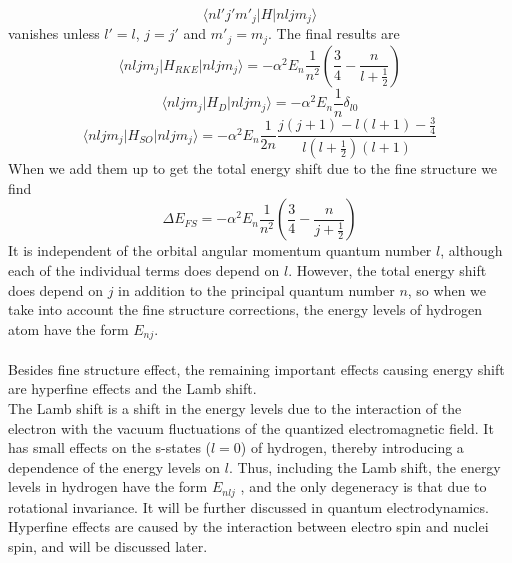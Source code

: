 \[\langle n l' j' m'_j | H | n l j m_j\rangle\]
vanishes unless $l'=l$, $j=j'$ and $m'_j = m_j$. The final results are
\[\langle n l j m_j | H_{RKE} | n l j m_j\rangle = -\alpha^2 E_n \frac{1}{n^2} \left(\frac{3}{4} - \frac{n}{l+\frac{1}{2}} \right)\]
\[\langle n l j m_j | H_{D} | n l j m_j\rangle = -\alpha^2 E_n \frac{1}{n}\delta_{l0}\]
\[\langle n l j m_j | H_{SO} | n l j m_j\rangle = -\alpha^2 E_n \frac{1}{2n} \frac{j(j+1)-l(l+1)-\frac{3}{4}}{l(l+\frac{1}{2})(l+1)}\]
When we add them up to get the total energy shift due to the fine structure we find
\[\Delta E_{FS} = -\alpha^2 E_n \frac{1}{n^2} \left(\frac{3}{4} - \frac{n}{j+\frac{1}{2}} \right)\]
It is independent of the orbital angular momentum quantum number $l$, although each of the individual terms does depend on $l$. However, the total energy shift does depend on $j$ in addition to the principal quantum number $n$, so when we take into account the fine structure corrections, the energy levels of hydrogen atom have the form $E_{nj}$.\\ \\
Besides fine structure effect, the remaining important effects causing energy shift are hyperfine effects and the Lamb shift.\\
The Lamb shift is a shift in the energy levels due to the interaction of the electron with the vacuum fluctuations of the quantized electromagnetic field. It has small effects on the s-states ($l = 0$) of hydrogen, thereby introducing a dependence of the energy levels on $l$. Thus, including the Lamb shift, the energy levels in hydrogen have the form $E_{nlj}$ , and the only degeneracy is that due to rotational invariance. It will be further discussed in quantum electrodynamics.\\
Hyperfine effects are caused by the interaction between electro spin and nuclei spin, and will be discussed later.

